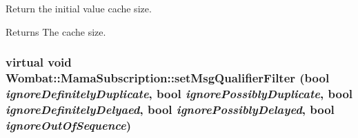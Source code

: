 Return the initial value cache size. \begin{DoxyReturn}{Returns}
The cache size. 
\end{DoxyReturn}
\hypertarget{classWombat_1_1MamaSubscription_a47002cfff7b77554fca3065ff2356bbe}{
\subsubsection[{setMsgQualifierFilter}]{\setlength{\rightskip}{0pt plus 5cm}virtual void Wombat::MamaSubscription::setMsgQualifierFilter (bool {\em ignoreDefinitelyDuplicate}, \/  bool {\em ignorePossiblyDuplicate}, \/  bool {\em ignoreDefinitelyDelyaed}, \/  bool {\em ignorePossiblyDelayed}, \/  bool {\em ignoreOutOfSequence})}}
\label{classWombat_1_1MamaSubscription_a47002cfff7b77554fca3065ff2356bbe}


